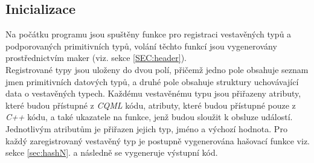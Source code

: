 \documentclass[11pt,twoside,a4paper]{book}
\begin{document}
\subsection{Inicializace}
Na počátku programu jsou spuštěny funkce pro registraci vestavěných typů a podporovaných primitivních typů, volání těchto funkcí jsou vygenerovány prostřednictvím maker (viz. sekce \ref{SEC:header}).\\
Registrované typy jsou uloženy do dvou polí, přičemž jedno pole obsahuje seznam jmen primitivních datových typů, a druhé pole obsahuje struktury uchovávající data o vestavěných typech. Každému vestavěnému typu jsou přiřazeny atributy, které budou přístupné z \textit{CQML} kódu, atributy, které budou přístupné pouze z \textit{C++} kódu, a také ukazatele na funkce, jenž budou sloužit k obsluze událostí. Jednotlivým atributům je přiřazen jejich typ, jméno a výchozí hodnota. Pro každý zaregistrovaný vestavěný typ je postupně vygenerována hašovací funkce viz. sekce \ref{sec:hashN}. a následně se vygeneruje výstupní kód.\\
\end{document}
